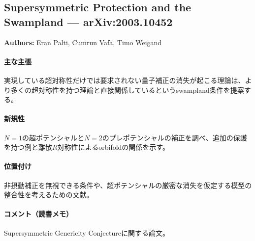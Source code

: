 \subsection{Supersymmetric Protection and the Swampland --- arXiv:2003.10452}

\textbf{Authors:} Eran Palti, Cumrun Vafa, Timo Weigand

\paragraph{主な主張}
実現している超対称性だけでは要求されない量子補正の消失が起こる理論は、より多くの超対称性を持つ理論と直接関係しているというswampland条件を提案する\cite{Palti:2020qlc}。

\paragraph{新規性}
$N=1$の超ポテンシャルと$N=2$のプレポテンシャルの補正を調べ、追加の保護を持つ例と離散$R$対称性によるorbifoldの関係を示す。

\paragraph{位置付け}
非摂動補正を無視できる条件や、超ポテンシャルの厳密な消失を仮定する模型の整合性を考えるための文献。

\paragraph{コメント（読書メモ）}
Supersymmetric Genericity Conjectureに関する論文。
